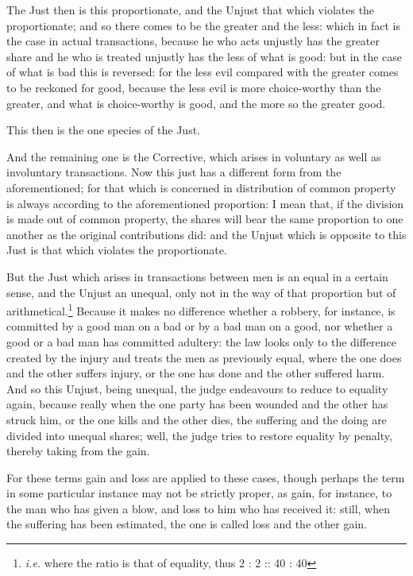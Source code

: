 The Just then is this proportionate, and the Unjust that which violates the
proportionate; and so there comes to be the greater and the less: which in fact
is the case in actual transactions, because he who acts unjustly has the
greater share and he who is treated unjustly has the less of what is good: but
in the case of what is bad this is reversed: for the less evil compared with
the greater comes to be reckoned for good, because the less evil is more
choice-worthy than the greater, and what is choice-worthy is good, and the more
so the greater good.

This then is the one species of the Just.


And the remaining one is the Corrective, which arises in voluntary as well as
involuntary transactions. Now this just has a different form from the
aforementioned; for that which is concerned in distribution of common property
is always according to the aforementioned proportion: I mean that, if the
division is made out of common property, the shares will bear the same
proportion to one another as the original contributions did: and the Unjust
which is opposite to this Just is that which violates the proportionate.

But the Just which arises in transactions between men is an equal in a certain
sense, and the Unjust an unequal, only not in the way of that proportion but of
arithmetical.\footnote{\emph{i.e.} where the ratio is that of equality, thus 2 : 2 :: 40 : 40}
Because it makes no difference whether a robbery, for instance, is committed by
a good man on a bad or by a bad man on a good, nor whether a good or a bad man
has committed adultery: the law looks only to the difference created by the
injury and treats the men as previously equal, where the one does and the other
suffers injury, or the one has done and the other suffered harm. And so this
Unjust, being unequal, the judge endeavours to reduce to equality again,
because really when the one party has been wounded and the other has struck
him, or the one kills and the other dies, the suffering and the doing are
divided into unequal shares; well, the judge tries to restore equality by
penalty, thereby taking from the gain.

For these terms gain and loss are applied to these cases, though perhaps the
term in some particular instance may not be strictly proper, as gain, for
instance, to the man who has given a blow, and loss to him who has received it:
still, when the suffering has been estimated, the one is called loss and the
other gain.


